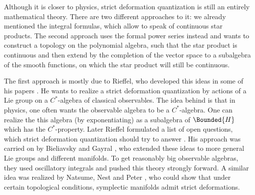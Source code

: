 Although it is closer to physics, strict deformation quantization is still an 
entirely mathematical theory. There are two different approaches to it: we 
already mentioned the integral formulas, which allow to speak of continuous star 
products. The second approach uses the formal power series instead and wants to 
construct a topology on the polynomial algebra, such that the star product is 
continuous and then extend by the completion of the vector space to a subalgebra 
of the smooth functions, on which the star product will still be continuous.


The first approach is mostly due to Rieffel, who developed this ideas in some of 
his papers \cite{rieffel:1989a, rieffel:1990c, rieffel:1993a}. He wants to 
realize a strict deformation quantization by actions of a Lie group on a 
$C^*$-algebra of classical observables. The idea behind is that in physics, one 
often wants the observable algebra to be a $C^*$-algebra. One can realize the 
this algebra (by exponentiating) as a subalgebra of $\Bounded{H}$ which has the 
$C^*$-property. Later Rieffel formulated a list of open questions, which strict 
deformation quantization should try to answer \cite{rieffel:1998a}. His approach 
was carried on by Bieliavsky and Gayral 
\cite{bieliavsky:2002a, bieliavsky.gayral:2015a}, who 
extended these ideas to more general Lie groups and different manifolds. To get 
reasonably big observable algebras, they used oscillatory integrals and pushed 
this theory strongly forward. A similar idea was realized by Natsume, Nest and 
Peter \cite{natsume.nest.peter:2003a}, who could show that under certain 
topological conditions, symplectic manifolds admit strict deformations.


